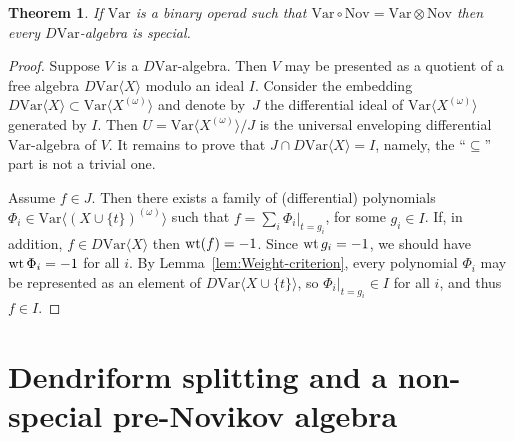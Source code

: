 \documentclass[11pt]{article}
\numberwithin{equation}{section}
\numberwithin{equation}{section}
\newtheorem{Theorem}{Theorem}[section]
\def\Var{\mathrm{Var}}
\def\Nov{\mathrm{Nov}}
\def\wt {\mathop {\fam 0 wt}\nolimits}
\begin{document}
\setcounter{Theorem}{3}
\begin{Theorem}\label{thm:Weight-Embedding}
If
$\Var $ is a binary operad such that
$\Var\circ \Nov = \Var\otimes \Nov $
then every $D\Var $-algebra is special.
\end{Theorem}

\begin{proof}
Suppose $V$ is a $D\Var $-algebra.
Then $V$ may be presented as a quotient
of a free algebra $D\Var\langle X\rangle $ modulo an ideal $I$.
Consider the embedding $D\Var\langle X\rangle \subset \Var\bigl\langle X^{(\omega )}\bigr\rangle $
and denote by~$J$ the differential ideal of $\Var\bigl\langle X^{(\omega )}\bigr\rangle $
generated by $I$.
Then $U = \Var \bigl\langle X^{(\omega )}\bigr\rangle /J$ is the universal enveloping
differential $\Var $-algebra of $V$. It remains to prove that $J\cap D\Var\langle X\rangle = I$,
namely, the ``$\subseteq $'' part is not a trivial one.

Assume $f\in J$. Then there exists a family of (differential) polynomials
$\Phi_i \in \Var\bigl\langle (X\cup\{t\})^{(\omega )} \bigr\rangle $
such that $f = \sum_i \Phi_i|_{t=g_i}$, for some $g_i\in I$.
If, in addition, $f\in D\Var\langle X\rangle $ then
$\wt (f)=-1$. Since $\wt g_i=-1$, we should have $\wt \Phi_i=-1$ for all $i$.
By Lemma~\ref{lem:Weight-criterion}, every polynomial $\Phi_i$ may be
represented as an element of $D\Var\langle X\cup\{t\}\rangle $,
so $\Phi_i|_{t=g_i} \in I$ for all $i$, and thus $f\in I$.
\end{proof}

\setcounter{section}{3}
\section{Dendriform splitting and a non-special pre-Novikov algebra}
\end{document}
